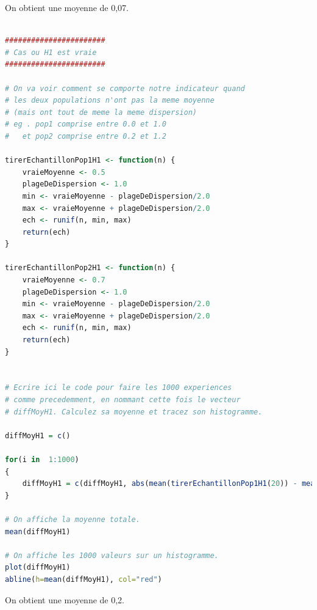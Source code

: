 On obtient une moyenne de 0,07.

\begin{lstlisting}[language=R]

#######################
# Cas ou H1 est vraie 
####################### 

# On va voir comment se comporte notre indicateur quand 
# les deux populations n'ont pas la meme moyenne
# (mais ont tout de meme la meme dispersion)
# eg . pop1 comprise entre 0.0 et 1.0
#   et pop2 comprise entre 0.2 et 1.2 

tirerEchantillonPop1H1 <- function(n) {
	vraieMoyenne <- 0.5
	plageDeDispersion <- 1.0
	min <- vraieMoyenne - plageDeDispersion/2.0
	max <- vraieMoyenne + plageDeDispersion/2.0
	ech <- runif(n, min, max)
	return(ech)
}

tirerEchantillonPop2H1 <- function(n) {
	vraieMoyenne <- 0.7
	plageDeDispersion <- 1.0
	min <- vraieMoyenne - plageDeDispersion/2.0
	max <- vraieMoyenne + plageDeDispersion/2.0
	ech <- runif(n, min, max)
	return(ech)
}


# Ecrire ici le code pour faire les 1000 experiences 
# comme precedemment, en nommant cette fois le vecteur
# diffMoyH1. Calculez sa moyenne et tracez son histogramme.

diffMoyH1 = c()

for(i in  1:1000)
{
	diffMoyH1 = c(diffMoyH1, abs(mean(tirerEchantillonPop1H1(20)) - mean(tirerEchantillonPop2H1(20))))
}

# On affiche la moyenne totale.
mean(diffMoyH1)

# On affiche les 1000 valeurs sur un histogramme.
plot(diffMoyH1)
abline(h=mean(diffMoyH1), col="red")

\end{lstlisting}

On obtient une moyenne de 0,2.

